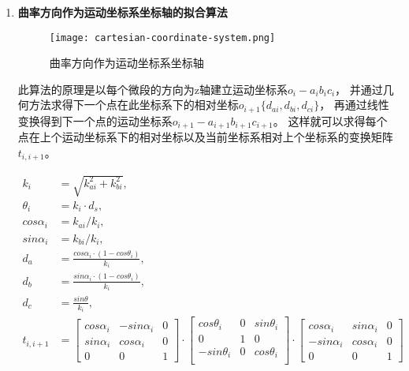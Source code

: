 \begin{enumerate}[label=(\Alph*)]
    \item \textbf{曲率方向作为运动坐标系坐标轴的拟合算法} \\

    \begin{figure}
    \centering
    \texttt{[image: cartesian-coordinate-system.png]}
    \caption{曲率方向作为运动坐标系坐标轴}
    \end{figure}

    此算法的原理是以每个微段的方向为z轴建立运动坐标系$o_i-a_ib_ic_i$，
    并通过几何方法求得下一个点在此坐标系下的相对坐标$o_{i+1} \{d_{ai}, d_{bi}, d_{ci}\}$，
    再通过线性变换得到下一个点的运动坐标系$o_{i+1}-a_{i+1}b_{i+1} c_{i+1}$。
    这样就可以求得每个点在上个运动坐标系下的相对坐标以及当前坐标系相对上个坐标系的变换矩阵$t_{i, i+1}$。

    \begin{align}
        k_i &= \sqrt{k_{ai} ^ 2 + k_{bi} ^ 2}, \\
        \theta_i &= k_i \cdot d_s, \\
        cos\alpha_i &= k_{ai} / k_i, \\
        sin\alpha_i &= k_{bi} / k_i, \\
        d_a &= \frac{cos\alpha_i \cdot (1 - cos\theta_i)}{k_i}, \\
        d_b &= \frac{sin\alpha_i \cdot (1 - cos\theta_i)}{k_i}, \\
        d_c &= \frac{sin\theta}{k_i}, \\
        t_{i, i+1} &= \left[
            \begin{matrix}
                cos \alpha_i & -sin \alpha_i & 0 \\
                sin \alpha_i & cos \alpha_i & 0 \\
                0 & 0 & 1
            \end{matrix}
            \right]
            \cdot
            \left[
            \begin{matrix}
                cos \theta_i & 0 & sin \theta_i \\
                0 & 1 & 0 \\
                -sin \theta_i & 0 & cos \theta_i \\
            \end{matrix}
            \right]
            \cdot
            \left[
            \begin{matrix}
                cos \alpha_i & sin \alpha_i & 0 \\
                -sin \alpha_i & cos \alpha_i & 0 \\
                0 & 0 & 1
            \end{matrix}
            \right]
    \end{align}


\end{enumerate}
